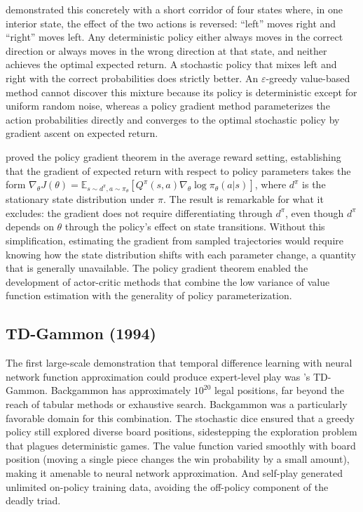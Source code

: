 \citet{SuttonMcAllester2000} demonstrated this concretely with a short corridor of four states where, in one interior state, the effect of the two actions is reversed: ``left'' moves right and ``right'' moves left. Any deterministic policy either always moves in the correct direction or always moves in the wrong direction at that state, and neither achieves the optimal expected return. A stochastic policy that mixes left and right with the correct probabilities does strictly better. An $\varepsilon$-greedy value-based method cannot discover this mixture because its policy is deterministic except for uniform random noise, whereas a policy gradient method parameterizes the action probabilities directly and converges to the optimal stochastic policy by gradient ascent on expected return.

\citet{SuttonMcAllester2000} proved the policy gradient theorem in the average reward setting, establishing that the gradient of expected return with respect to policy parameters takes the form $\nabla_\theta J(\theta) = \mathbb{E}_{s \sim d^\pi, a \sim \pi_\theta} [Q^\pi(s,a) \nabla_\theta \log \pi_\theta(a|s)]$, where $d^\pi$ is the stationary state distribution under $\pi$. The result is remarkable for what it excludes: the gradient does not require differentiating through $d^\pi$, even though $d^\pi$ depends on $\theta$ through the policy's effect on state transitions. Without this simplification, estimating the gradient from sampled trajectories would require knowing how the state distribution shifts with each parameter change, a quantity that is generally unavailable. The policy gradient theorem enabled the development of actor-critic methods that combine the low variance of value function estimation with the generality of policy parameterization.

\subsection{TD-Gammon (1994)}

The first large-scale demonstration that temporal difference learning with neural network function approximation could produce expert-level play was \citet{tesauro1994}'s TD-Gammon. Backgammon has approximately $10^{20}$ legal positions, far beyond the reach of tabular methods or exhaustive search. Backgammon was a particularly favorable domain for this combination. The stochastic dice ensured that a greedy policy still explored diverse board positions, sidestepping the exploration problem that plagues deterministic games. The value function varied smoothly with board position (moving a single piece changes the win probability by a small amount), making it amenable to neural network approximation. And self-play generated unlimited on-policy training data, avoiding the off-policy component of the deadly triad.

